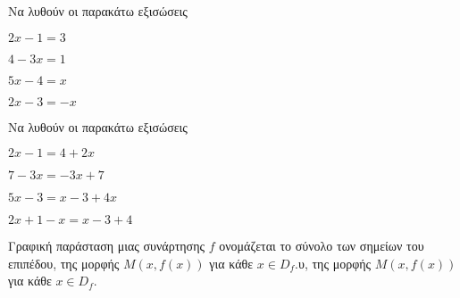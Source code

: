 
Να λυθούν οι παρακάτω εξισώσεις
\begin{rlist}
\begin{multicols}{2}
\item $ 2x-1=3 $
\item $ 4-3x=1 $
\item $ 5x-4=x $
\item $ 2x-3=-x $
\end{multicols}
\end{rlist}

Να λυθούν οι παρακάτω εξισώσεις
\begin{rlist}
\item $ 2x-1=4+2x $
\item $ 7-3x=-3x+7 $
\item $ 5x-3=x-3+4x $
\item $ 2x+1-x=x-3+4 $
\end{rlist}

Γραφική παράσταση μιας συνάρτησης $ f $ ονομάζεται το σύνολο των σημείων του επιπέδου, της μορφής $ M(x,f(x)) $ για κάθε $ x\in D_f $.υ, της μορφής $ M(x,f(x)) $ για κάθε $ x\in D_f $.

